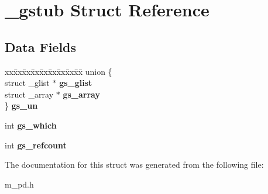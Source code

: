 \hypertarget{struct__gstub}{}\section{\+\_\+gstub Struct Reference}
\label{struct__gstub}
\subsection*{Data Fields}
\begin{DoxyCompactItemize}
\item 
\mbox{\label{struct__gstub_aeeede2ed14f8f20de4feccc83881ee1d}} 
\begin{tabbing}
xx\=xx\=xx\=xx\=xx\=xx\=xx\=xx\=xx\=\kill
union \{\\
\>struct \_glist $\ast$ {\bfseries gs\_glist}\\
\>struct \_array $\ast$ {\bfseries gs\_array}\\
\} {\bfseries gs\_un}\\

\end{tabbing}\item 
\mbox{\label{struct__gstub_ab3ad08cf539f7263da92d9b3cdce1cf9}} 
int {\bfseries gs\+\_\+which}
\item 
\mbox{\label{struct__gstub_acf5f57a388b6ac9be25e1eca6715253b}} 
int {\bfseries gs\+\_\+refcount}
\end{DoxyCompactItemize}


The documentation for this struct was generated from the following file\+:\begin{DoxyCompactItemize}
\item 
m\+\_\+pd.\+h\end{DoxyCompactItemize}
